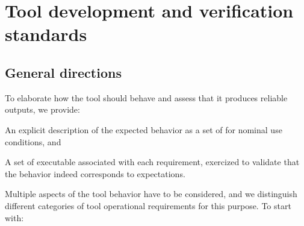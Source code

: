 \documentclass {report}
\begin{document}
\chapter{Tool development and verification standards}
\label{chap:devstd}

\section{General directions}
\label{sec:devstd-overview}

To elaborate how the tool should behave and assess that it produces reliable
outputs, we provide:

\begin{Itemize}
\item%
  An explicit description of the expected behavior as a set of  for nominal use conditions,
  and
\item%
  A set of executable  associated with each requirement,
  exercized to validate that the behavior indeed corresponds to expectations.
\end{Itemize}

Multiple aspects of the tool behavior have to be considered, and we
distinguish different categories of tool operational requirements for this
purpose.
%
To start with:
\end{document}
